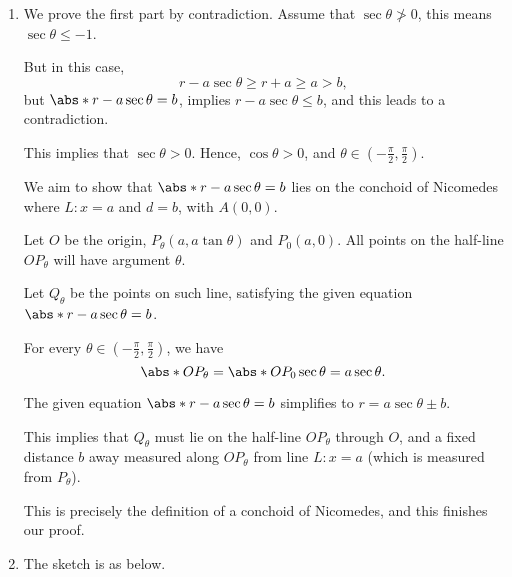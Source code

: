 \Question{\currfilebase}

\begin{enumerate}
    \item We prove the first part by contradiction. Assume that \(\sec\theta \ngtr 0\), this means \(\sec \theta \leq -1\).

          But in this case,
          \[
              r - a \sec \theta \geq r + a \geq a > b,
          \]
          but \(\abs*{r - a \sec \theta} = b\), implies \(r - a \sec \theta \leq b\), and this leads to a contradiction.

          This implies that \(\sec \theta > 0\). Hence, \(\cos \theta > 0\), and \(\theta \in \left(-\frac{\pi}{2}, \frac{\pi}{2}\right)\).

          We aim to show that \(\abs*{r - a \sec \theta} = b\) lies on the conchoid of Nicomedes where \(L: x = a\) and \(d = b\), with \(A(0, 0)\).

          Let \(O\) be the origin, \(P_{\theta}(a, a \tan \theta)\) and \(P_0(a, 0)\). All points on the half-line \(OP_{\theta}\) will have argument \(\theta\).

          \begin{center}
              
          \end{center}

          Let \(Q_{\theta}\) be the points on such line, satisfying the given equation \(\abs*{r - a \sec \theta} = b\).

          For every \(\theta \in \left(-\frac{\pi}{2}, \frac{\pi}{2}\right)\), we have
          \[
              \abs*{OP_{\theta}} = \abs*{OP_0} \sec \theta = a \sec \theta.
          \]

          The given equation \(\abs*{r - a \sec \theta} = b\) simplifies to \(r = a \sec \theta \pm b\).

          This implies that \(Q_{\theta}\) must lie on the half-line \(OP_{\theta}\) through \(O\), and a fixed distance \(b\) away measured along \(OP_{\theta}\) from line \(L: x = a\) (which is measured from \(P_{\theta}\)).

          This is precisely the definition of a conchoid of Nicomedes, and this finishes our proof.

          \begin{center}
              
          \end{center}

    \item The sketch is as below.


\end{enumerate}
